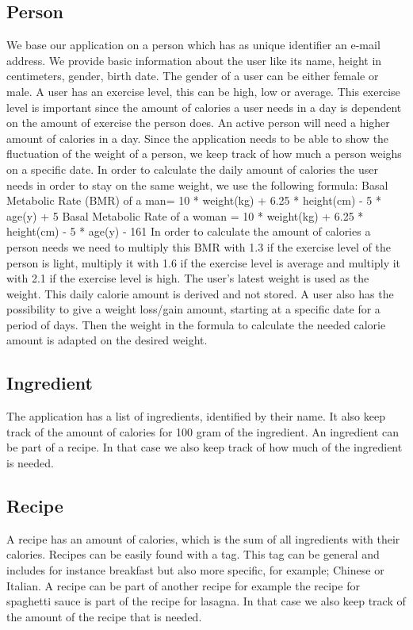 \subsection{Person} 

We base our application on a person which has as unique identifier an e-mail address. We provide basic information about the user like its  name, height in centimeters, gender, birth date. The gender of a user can be either female or male. A user has an exercise level, this can be high, low or average. This exercise level is important since the amount of calories a user needs in a day is dependent on the amount of exercise the person does. An active person will need a higher amount of calories in a day. Since the application needs to be able to show the fluctuation of the weight of a person, we keep track of how much a person weighs on a specific date. In order to calculate the daily amount of calories the user needs in order to stay on the same weight, we use the following formula: \newline
Basal Metabolic Rate (BMR) of a man= 10 * weight(kg) + 6.25 * height(cm) - 5 * age(y) + 5 \newline
Basal Metabolic Rate of a  woman = 10 * weight(kg) + 6.25 * height(cm) - 5 * age(y) - 161 \newline
In order to calculate the amount of calories a person needs we need to multiply this BMR with 1.3 if the exercise level of the person is light, multiply it with 1.6 if the exercise level is average and multiply it with 2.1 if the exercise level is high. The user's latest weight is used as the weight. This daily calorie amount is derived and not stored. A user also has the possibility to give a weight loss/gain amount, starting at a specific date for a period of days. Then the weight in the formula to calculate the needed calorie amount is adapted on the desired weight. 

\subsection{Ingredient}
The application has a list of ingredients, identified by their name. It also keep track of the amount of calories for 100 gram of the ingredient. An ingredient can be part of a recipe. In that case we also keep track of how much of the ingredient is needed.

\subsection{Recipe}
 A recipe has an amount of calories, which is the sum of all ingredients with their calories. Recipes can be easily found with a tag. This tag can be general and includes for instance breakfast but also more specific, for example; Chinese or Italian. A recipe can be part of another recipe for example the recipe for spaghetti sauce is part of the recipe for lasagna. In that case we also keep track of the amount of the recipe that is needed.   


